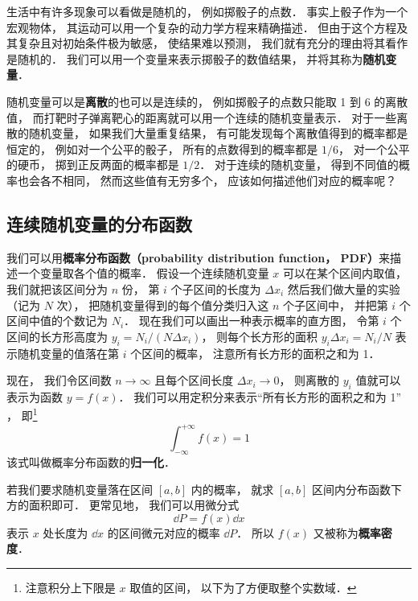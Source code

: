 

生活中有许多现象可以看做是随机的， 例如掷骰子的点数． 事实上骰子作为一个宏观物体， 其运动可以用一个复杂的动力学方程来精确描述． 但由于这个方程及其复杂且对初始条件极为敏感， 使结果难以预测， 我们就有充分的理由将其看作是随机的． 我们可以用一个变量来表示掷骰子的数值结果， 并将其称为\textbf{随机变量}．

随机变量可以是\textbf{离散}的也可以是连续的， 例如掷骰子的点数只能取 1 到 6 的离散值， 而打靶时子弹离靶心的距离就可以用一个连续的随机变量表示． 对于一些离散的随机变量， 如果我们大量重复结果， 有可能发现每个离散值得到的概率都是恒定的， 例如对一个公平的骰子， 所有的点数得到的概率都是 $1/6$， 对一个公平的硬币， 掷到正反两面的概率都是 $1/2$． 对于连续的随机变量， 得到不同值的概率也会各不相同， 然而这些值有无穷多个， 应该如何描述他们对应的概率呢？

\subsection{连续随机变量的分布函数}
我们可以用\textbf{概率分布函数（probability distribution function， PDF）}来描述一个变量取各个值的概率． 假设一个连续随机变量 $x$ 可以在某个区间内取值， 我们就把该区间分为 $n$ 份， 第 $i$ 个子区间的长度为 $\Delta x_i$ 然后我们做大量的实验（记为 $N$ 次）， 把随机变量得到的每个值分类归入这 $n$ 个子区间中， 并把第 $i$ 个区间中值的个数记为 $N_i$． 现在我们可以画出一种表示概率的直方图， 令第 $i$ 个区间的长方形高度为 $y_i = N_i/(N \Delta x_i)$， 则每个长方形的面积 $y_i \Delta x_i = N_i/N$ 表示随机变量的值落在第 $i$ 个区间的概率， 注意所有长方形的面积之和为 1．


现在， 我们令区间数 $n\to \infty$ 且每个区间长度 $\Delta x_i \to 0$， 则离散的 $y_i$ 值就可以表示为函数 $y = f(x)$． 我们可以用定积分来表示“所有长方形的面积之和为 1” ， 即\footnote{注意积分上下限是 $x$ 取值的区间， 以下为了方便取整个实数域．}
\begin{equation}
\int_{-\infty}^{+\infty} f(x) = 1
\end{equation}
该式叫做概率分布函数的\textbf{归一化}．

若我们要求随机变量落在区间 $[a,b]$ 内的概率， 就求 $[a,b]$ 区间内分布函数下方的面积即可． 更常见地， 我们可以用微分式
\begin{equation}
\dd{P} = f(x) \dd{x}
\end{equation}
表示 $x$ 处长度为 $\dd{x}$ 的区间微元对应的概率 $\dd{P}$． 所以 $f(x)$ 又被称为\textbf{概率密度}．

